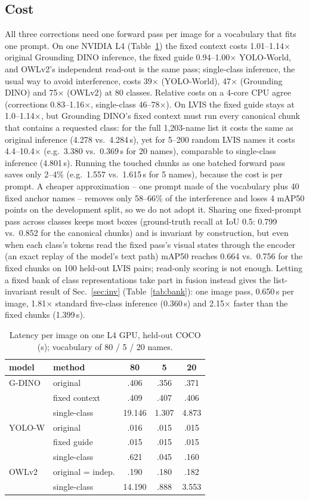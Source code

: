 \documentclass[10pt,twocolumn,letterpaper]{article}
\begin{document}
\subsection{Cost}
All three corrections need one forward pass per image for a vocabulary that fits one prompt. On one NVIDIA L4
(Table~\ref{tab:lat}) the fixed context costs 1.01--1.14$\times$ original Grounding DINO inference, the fixed guide
0.94--1.00$\times$ YOLO-World, and OWLv2's independent read-out is the same pass; single-class inference, the usual way
to avoid interference, costs 39$\times$ (YOLO-World), 47$\times$ (Grounding DINO) and 75$\times$ (OWLv2) at 80 classes.
Relative costs on a 4-core CPU agree (corrections 0.83--1.16$\times$, single-class 46--78$\times$). On LVIS the fixed
guide stays at 1.0--1.14$\times$, but Grounding DINO's fixed context must run every canonical chunk that contains a
requested class: for the full 1{,}203-name list it costs the same as original inference (4.278 vs.\ 4.284\,s), yet for
5--200 random LVIS names it costs 4.4--10.4$\times$ (e.g.\ 3.380 vs.\ 0.369\,s for 20 names), comparable to single-class
inference (4.801\,s). Running the touched chunks as one batched forward pass saves only 2--4\% (e.g.\ 1.557 vs.\ 1.615\,s
for 5 names), because the cost is per prompt. A cheaper approximation -- one prompt made of the vocabulary plus 40 fixed
anchor names -- removes only 58--66\% of the interference and loses 4 mAP50 points on the development split, so we do not
adopt it. Sharing one fixed-prompt pass across classes keeps most boxes (ground-truth recall at IoU 0.5: 0.799 vs.\
0.852 for the canonical chunks) and is invariant by construction, but even when each class's tokens read the fixed pass's
visual states through the encoder (an exact replay of the model's text path) mAP50 reaches 0.664 vs.\ 0.756 for the fixed
chunks on 100 held-out LVIS pairs; read-only scoring is not enough. Letting a fixed bank of class representations take part in fusion instead gives the list-invariant result of
Sec.~\ref{sec:inv} (Table~\ref{tab:bank}): one image pass, 0.650\,s per image, 1.81$\times$ standard five-class inference
(0.360\,s) and 2.15$\times$ faster than the fixed chunks (1.399\,s).
\begin{table}[t]\centering\small\setlength{\tabcolsep}{3pt}
\caption{Latency per image on one L4 GPU, held-out COCO (s); vocabulary of 80 / 5 / 20 names.}\label{tab:lat}
\begin{tabular}{llccc}\toprule
model & method & 80 & 5 & 20\\\midrule
G-DINO & original & .406 & .356 & .371\\
 & fixed context & .409 & .407 & .406\\
 & single-class & 19.146 & 1.307 & 4.873\\
YOLO-W & original & .016 & .015 & .015\\
 & fixed guide & .015 & .015 & .015\\
 & single-class & .621 & .045 & .160\\
OWLv2 & original = indep. & .190 & .180 & .182\\
 & single-class & 14.190 & .888 & 3.553\\\bottomrule
\end{tabular}\end{table}
\end{document}
